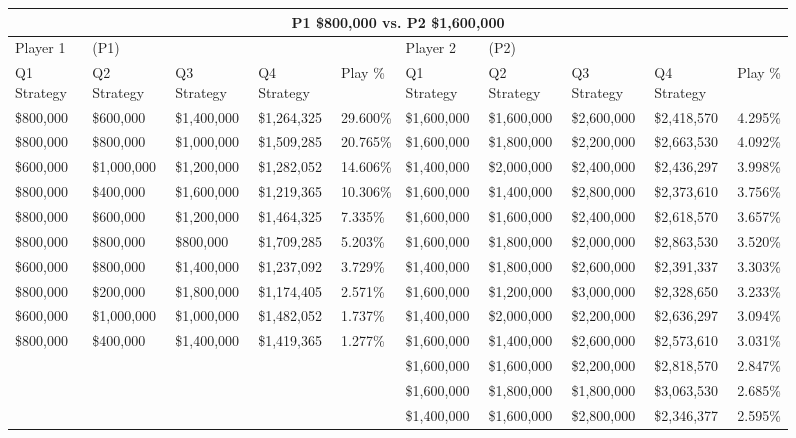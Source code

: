\documentclass[11pt]{article}
\begin{document}
\begin{figure}
\tiny
\begin{tabular}{ |p{1.0cm}p{1.0cm}p{1.0cm}p{2.0cm}|p{1.0cm}||p{1.0cm}p{1.0cm}p{1.0cm}p{2.0cm}|p{1.0cm}|}
\hline
\multicolumn{10}{|c|}{P1 \$800,000 vs. P2 \$1,600,000} \\
\hline
Player 1 & (P1) & & & & Player 2 & (P2) & & & \\
\hline
Q1 Strategy & Q2 Strategy & Q3 Strategy & Q4 Strategy  &  Play \% & Q1 Strategy & Q2 Strategy & Q3 Strategy & Q4 Strategy  &  Play \%\\
\hline
\$800,000 & \$600,000 & \$1,400,000 & \$1,264,325 & 29.600\% & \$1,600,000 & \$1,600,000 & \$2,600,000 & \$2,418,570 & 4.295\% \\
\$800,000 & \$800,000 & \$1,000,000 & \$1,509,285 & 20.765\% & \$1,600,000 & \$1,800,000 & \$2,200,000 & \$2,663,530 & 4.092\% \\
\$600,000 & \$1,000,000 & \$1,200,000 & \$1,282,052 & 14.606\% & \$1,400,000 & \$2,000,000 & \$2,400,000 & \$2,436,297 & 3.998\% \\
\$800,000 & \$400,000 & \$1,600,000 & \$1,219,365 & 10.306\% & \$1,600,000 & \$1,400,000 & \$2,800,000 & \$2,373,610 & 3.756\% \\
\$800,000 & \$600,000 & \$1,200,000 & \$1,464,325 & 7.335\% & \$1,600,000 & \$1,600,000 & \$2,400,000 & \$2,618,570 & 3.657\% \\
\$800,000 & \$800,000 & \$800,000 & \$1,709,285 & 5.203\% & \$1,600,000 & \$1,800,000 & \$2,000,000 & \$2,863,530 & 3.520\% \\
\$600,000 & \$800,000 & \$1,400,000 & \$1,237,092 & 3.729\% & \$1,400,000 & \$1,800,000 & \$2,600,000 & \$2,391,337 & 3.303\% \\
\$800,000 & \$200,000 & \$1,800,000 & \$1,174,405 & 2.571\% & \$1,600,000 & \$1,200,000 & \$3,000,000 & \$2,328,650 & 3.233\% \\
\$600,000 & \$1,000,000 & \$1,000,000 & \$1,482,052 & 1.737\% & \$1,400,000 & \$2,000,000 & \$2,200,000 & \$2,636,297 & 3.094\% \\
\$800,000 & \$400,000 & \$1,400,000 & \$1,419,365 & 1.277\% & \$1,600,000 & \$1,400,000 & \$2,600,000 & \$2,573,610 & 3.031\% \\
& & & & & \$1,600,000 & \$1,600,000 & \$2,200,000 & \$2,818,570 & 2.847\% \\
& & & & & \$1,600,000 & \$1,800,000 & \$1,800,000 & \$3,063,530 & 2.685\% \\
& & & & & \$1,400,000 & \$1,600,000 & \$2,800,000 & \$2,346,377 & 2.595\% \\

\end{tabular}
\end{figure}
\end{document}
